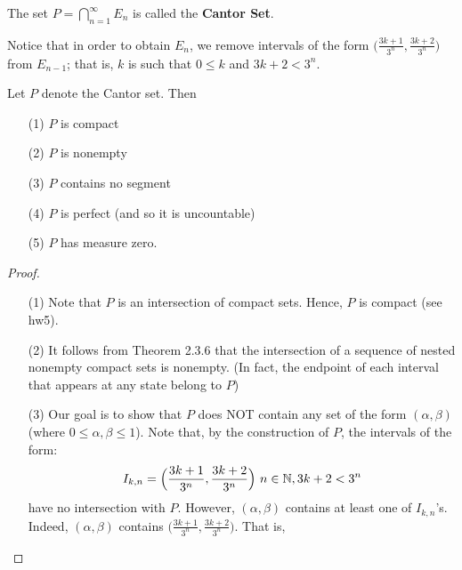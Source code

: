 \documentclass[a4paper]{report}
\begin{document}
The set \( P = \bigcap_{ n=1  }^{ \infty    }  {E}_{n} \) is called the \textbf{Cantor Set}.

\begin{remark}
    Notice that in order to obtain \( {E}_{n} \), we remove intervals of the form \( \Big(  \frac{ 3 k + 1  }{ 3^{n} } , \frac{ 3 k + 2  }{ 3^{n} }  \Big) \) from \( {E}_{n-1} \); that is, \( k  \) is such that \( 0 \leq k  \) and \( 3 k + 2 < 3^{n} \).
\end{remark}

\begin{theorem}
    Let \( P  \) denote the Cantor set. Then
    \begin{enumerate}
        \item[(1)] \( P \) is compact
        \item[(2)] \( P  \) is nonempty
        \item[(3)] \( P  \) contains no segment
        \item[(4)] \( P  \) is perfect (and so it is uncountable)
        \item[(5)] \( P  \) has measure zero.
    \end{enumerate}
\end{theorem}

\begin{proof}
\begin{enumerate}
    \item[(1)] Note that \( P  \) is an intersection of compact sets. Hence, \( P  \) is compact (see hw5).
    \item[(2)] It follows from Theorem 2.3.6 that the intersection of a sequence of nested nonempty compact sets is nonempty. (In fact, the endpoint of each interval that appears at any state belong to \( P \))
    \item[(3)] Our goal is to show that \( P  \) does NOT contain any set of the form \( (\alpha, \beta) \) (where \( 0 \leq \alpha, \beta \leq 1 \)). Note that, by the construction of \( P  \), the intervals of the form:
        \[  {I}_{k,n} = \Big(  \frac{ 3k+1 }{  3^{n} } , \frac{ 3k + 2  }{ 3^{n} }  \Big) \  n \in \mathbb{N}, \\ 3k + 2 < 3^{n}  \]
        have no intersection with \( P  \). However, \( (\alpha, \beta) \) contains at least one of \( {I}_{k,n} \)'s. Indeed, \( (\alpha, \beta) \) contains \( \Big(  \frac{ 3k+1  }{ 3^{n} } , \frac{ 3k+2  }{ 3^{n} }  \Big) \). That is,  
\end{enumerate}
\end{proof}
\end{document}
